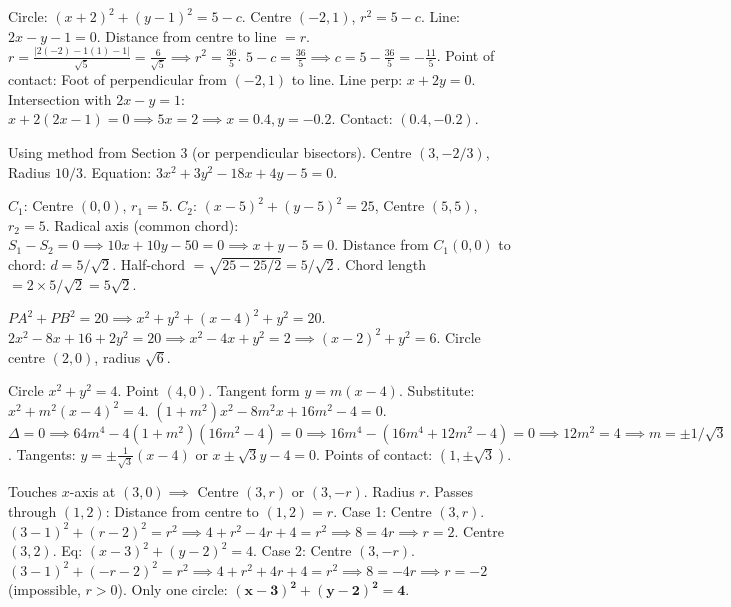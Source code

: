 \documentclass[11pt]{article}
\begin{document}
\begin{corrige}[Exercise 2]
Circle: $(x+2)^2+(y-1)^2 = 5-c$. Centre $(-2,1)$, $r^2=5-c$.
Line: $2x-y-1=0$. Distance from centre to line $= r$.
$r = \frac{|2(-2)-1(1)-1|}{\sqrt{5}} = \frac{6}{\sqrt{5}} \implies r^2 = \frac{36}{5}$.
$5-c = \frac{36}{5} \implies c = 5 - \frac{36}{5} = -\frac{11}{5}$.
Point of contact: Foot of perpendicular from $(-2,1)$ to line.
Line perp: $x+2y=0$. Intersection with $2x-y=1$: $x+2(2x-1)=0 \implies 5x=2 \implies x=0.4, y=-0.2$.
Contact: $(0.4, -0.2)$.
\end{corrige}

\begin{corrige}[Exercise 3]
Using method from Section 3 (or perpendicular bisectors).
Centre $(3, -2/3)$, Radius $10/3$.
Equation: $3x^2+3y^2-18x+4y-5=0$.
\end{corrige}

\begin{corrige}[Exercise 4]
$C_1$: Centre $(0,0)$, $r_1=5$. $C_2$: $(x-5)^2+(y-5)^2=25$, Centre $(5,5)$, $r_2=5$.
Radical axis (common chord): $S_1-S_2=0 \implies 10x+10y-50=0 \implies x+y-5=0$.
Distance from $C_1(0,0)$ to chord: $d = 5/\sqrt{2}$.
Half-chord $= \sqrt{25 - 25/2} = 5/\sqrt{2}$.
Chord length $= 2 \times 5/\sqrt{2} = 5\sqrt{2}$.
\end{corrige}

\begin{corrige}[Exercise 5]
$PA^2+PB^2=20 \implies x^2+y^2 + (x-4)^2+y^2 = 20$.
$2x^2-8x+16+2y^2=20 \implies x^2-4x+y^2=2 \implies (x-2)^2+y^2=6$.
Circle centre $(2,0)$, radius $\sqrt{6}$.
\end{corrige}

\begin{corrige}[Exercise 6]
Circle $x^2+y^2=4$. Point $(4,0)$.
Tangent form $y=m(x-4)$. Substitute: $x^2+m^2(x-4)^2=4$.
$(1+m^2)x^2 - 8m^2 x + 16m^2-4=0$.
$\Delta=0 \implies 64m^4 - 4(1+m^2)(16m^2-4)=0 \implies 16m^4 - (16m^4+12m^2-4)=0 \implies 12m^2=4 \implies m=\pm 1/\sqrt{3}$.
Tangents: $y = \pm \frac{1}{\sqrt{3}}(x-4)$ or $x \pm \sqrt{3}y - 4 = 0$.
Points of contact: $(1, \pm \sqrt{3})$.
\end{corrige}

\begin{corrige}[Exercise 7]
Touches $x$-axis at $(3,0) \implies$ Centre $(3, r)$ or $(3, -r)$. Radius $r$.
Passes through $(1,2)$: Distance from centre to $(1,2) = r$.
Case 1: Centre $(3, r)$. $(3-1)^2+(r-2)^2 = r^2 \implies 4 + r^2-4r+4 = r^2 \implies 8=4r \implies r=2$.
Centre $(3,2)$. Eq: $(x-3)^2+(y-2)^2=4$.
Case 2: Centre $(3, -r)$. $(3-1)^2+(-r-2)^2 = r^2 \implies 4 + r^2+4r+4 = r^2 \implies 8=-4r \implies r=-2$ (impossible, $r>0$).
Only one circle: $\mathbf{(x-3)^2+(y-2)^2=4}$.
\end{corrige}
\end{document}
